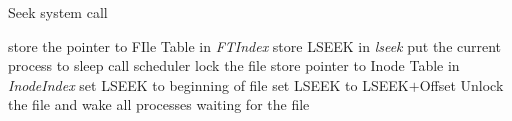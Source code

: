 \documentclass[10pt]{article}
\begin{document}
\begin{algorithm}
\caption{Seek system call}
\begin{algorithmic}
\ENDIF
{}
\ELSE 
    \STATE store the pointer to FIle Table in  \textit{FTIndex}
    \STATE store LSEEK in  \textit{lseek}
\ENDIF
{}
    \STATE put the current process to sleep
    \STATE call scheduler
\ENDWHILE
\STATE lock the file
\STATE store pointer to Inode Table in  \textit{InodeIndex}
\ENDIF
{}
    \STATE set LSEEK to beginning of file
\ELSE
    \STATE set LSEEK to LSEEK$+$Offset
\ENDIF
\STATE Unlock the file and wake all processes waiting for the file
\end{algorithmic}
\end{algorithm}
\end{document}
